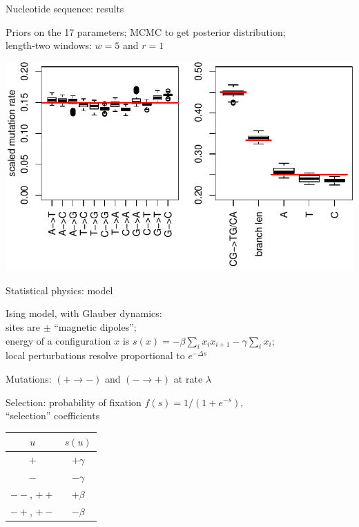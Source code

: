 \documentclass[smaller]{beamer}
\begin{document}
\begin{frame}{Nucleotide sequence: results}

  Priors on the 17 parameters; MCMC to get posterior distribution;\\
  \hspace{2em} length-two windows: $w=5$ and $r=1$

  \begin{center}
\includegraphics[width=\textwidth]{../../../writeup-plots/selsims-2013-06-03-13-17-0187525-estimate-boxplots}
\end{center}

\end{frame}

\begin{frame}{Statistical physics: model}

  Ising model, with Glauber dynamics: \\
  \hspace{2em} sites are $\pm $ ``magnetic dipoles''; \\
  \hspace{2em}   energy of a configuration $x$ is $s(x) = - \beta \sum_i x_i x_{i+1} - \gamma \sum_i x_i$; \\
   \hspace{2em}  local perturbations resolve proportional to $e^{-\Delta s}$

   \vspace{2em}

   Mutations: $(+ \to -)$ and $(- \to +)$ at rate $\lambda$

   \vspace{2em}

  Selection: probability of fixation $f(s) = 1/(1+e^{-s})$, \\
  \hspace{3em} ``selection'' coefficients
  \begin{center}
    \begin{tabular}{c|c}
      $u$  &  $s(u)$ \\
      \hline
      $+$ & $+\gamma$ \\
      $-$ & $-\gamma$ \\
      $--$, $++$  & $+\beta$ \\
      $-+$, $+-$  & $-\beta$ 
    \end{tabular}
  \end{center}

\end{frame}
\end{document}
